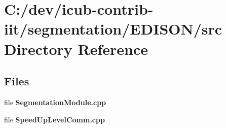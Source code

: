 \section{C\+:/dev/icub-\/contrib-\/iit/segmentation/\+E\+D\+I\+S\+O\+N/src Directory Reference}
\label{dir_9337aeb1f0fb0d2aa68860b49d7692c0}
\subsection*{Files}
\begin{DoxyCompactItemize}
\item 
file {\bfseries Segmentation\+Module.\+cpp}
\item 
file {\bfseries Speed\+Up\+Level\+Comm.\+cpp}
\end{DoxyCompactItemize}
